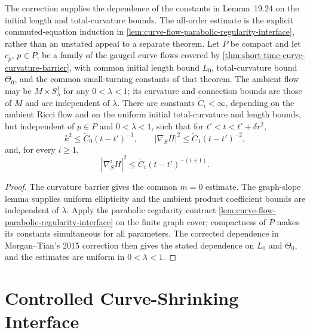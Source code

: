 \begin{theorem}
\label{thm:curve-shrinking-derivative-estimates}
\notready
The correction supplies the dependence of the constants in Lemma~19.24 on
the initial length and total-curvature bounds.  The all-order estimate is the
explicit commuted-equation induction in
\ref{lem:curve-flow-parabolic-regularity-interface}, rather than an
unstated appeal to a separate theorem.
Let $P$ be compact and let $c_p$, $p\in P$, be a family of the gauged curve
flows covered by \ref{thm:short-time-curve-curvature-barrier}, with common
initial length bound $L_0$, total-curvature bound $\Theta_0$, and the common
small-turning constants of that theorem.  The ambient flow may be
$M\times S^1_\lambda$ for any $0<\lambda<1$; its curvature and connection
bounds are those of $M$ and are independent of $\lambda$.  There are constants
$\widetilde C_i<\infty$, depending on the ambient Ricci flow and on the
uniform initial total-curvature and length bounds, but independent of
$p\in P$ and $0<\lambda<1$, such that
for $t'<t<t'+\delta r^2$,
\[
 k^2\le \widetilde C_0(t-t')^{-1},\qquad
 |\nabla_SH|^2\le\widetilde C_1(t-t')^{-2},
\]
and, for every $i\ge1$,
\[
 |\nabla_S^iH|^2\le\widetilde C_i(t-t')^{-(i+1)}.
\]
\end{theorem}
\begin{proof}
The curvature barrier gives the common $m=0$ estimate.  The graph-slope
lemma supplies uniform ellipticity and the ambient product coefficient bounds
are independent of $\lambda$.  Apply the parabolic regularity contract
\ref{lem:curve-flow-parabolic-regularity-interface} on the finite graph cover;
compactness of $P$ makes its constants simultaneous for all parameters.
The corrected dependence in Morgan--Tian's 2015 correction then gives the
stated dependence on $L_0$ and $\Theta_0$, and the estimates are uniform in
$0<\lambda<1$.
\end{proof}

\section{Controlled Curve-Shrinking Interface}

